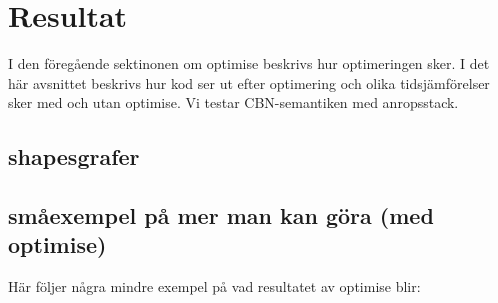 \documentclass[Rapport]{subfiles}
\begin{document}
\section{Resultat}


I den föregående sektinonen om optimise beskrivs hur optimeringen sker.
I det här avsnittet beskrivs hur kod ser ut efter optimering och 
olika tidsjämförelser sker med och utan optimise. 
Vi testar CBN-semantiken med anropsstack.

\subsection{shapesgrafer}



\subsection{småexempel på mer man kan göra (med optimise)} 

Här följer några mindre exempel på vad resultatet av optimise blir:
\end{document}
